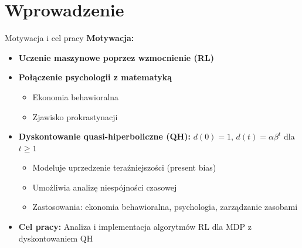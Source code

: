 \section{Wprowadzenie}

\begin{frame}{Motywacja i cel pracy}
\textbf{Motywacja:}   
\begin{itemize}
    \item \textbf{Uczenie maszynowe poprzez wzmocnienie (RL)}
    \vspace{0.3em}
    \item \textbf{Połączenie psychologii z matematyką}
    \begin{itemize}
        \item Ekonomia behawioralna
        \item Zjawisko prokrastynacji
    \end{itemize}
    \vspace{0.3em}
    \item \textbf{Dyskontowanie quasi-hiperboliczne (QH):} $d(0) = 1$, $d(t) = \alpha\beta^t$ dla $t \geq 1$
    \begin{itemize}
        \item Modeluje uprzedzenie teraźniejszości (present bias)
        \item Umożliwia analizę niespójności czasowej
        \item Zastosowania: ekonomia behawioralna, psychologia, zarządzanie zasobami
    \end{itemize}
    \vspace{0.3em}
    \item \textbf{Cel pracy:} Analiza i implementacja algorytmów RL dla MDP z dyskontowaniem QH
\end{itemize}
\end{frame}

